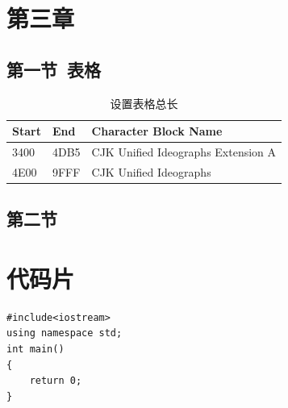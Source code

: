 \documentclass{ctexart}
\begin{document}




\section{第三章}

\subsection{第一节\ 表格}

\begin{table}[H]
\caption{设置表格总长} 
\begin{tabular*}{12cm}{lll}
\hline  
Start & End  & Character Block Name \\  
\hline  
3400  & 4DB5 & CJK Unified Ideographs Extension A \\  
4E00  & 9FFF & CJK Unified Ideographs \\  
\hline  
\end{tabular*} 
\end{table} 

\subsection{第二节}




\clearpage
\section{代码片}
\lstset{language=C}
\begin{lstlisting}
#include<iostream>
using namespace std;
int main()
{
    return 0;
}
\end{lstlisting}

\end{document}
